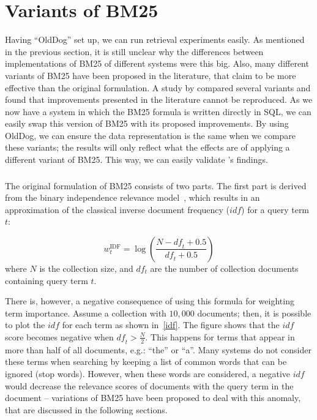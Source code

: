 \section{Variants of BM25}
\label{ir_db_variants}
Having ``OldDog'' set up, we can run retrieval experiments easily. As mentioned in the previous section, it is still unclear why the differences between implementations of BM25 of different systems were this big. Also, many different variants of BM25 have been proposed in the literature, that claim to be more effective than the original formulation. A study by \citet{trotman-bm25} compared several variants and found that improvements presented in the literature cannot be reproduced. 
As we now have a system in which the BM25 formula is written directly in SQL, we can easily swap this version of BM25 with its proposed improvements. By using OldDog, we can ensure the data representation is the same when we compare these variants; the results will only reflect what the effects are of applying a different variant of BM25. This way, we can easily validate \citeauthor{trotman-bm25}'s findings.

\subsubsection{} 
The original formulation of BM25 consists of two parts. The first part is derived from the binary independence relevance model~\citep{bm25-beyond}, which results in an approximation of the classical inverse document frequency ($\mathit{idf}$) for a query term $t$:

\begin{equation} 
	w_t^{\text{IDF}} = \log\left(\frac{N-\mathit{df}_t+0.5}{\mathit{df}_t+0.5}\right)
\end{equation}
where $N$ is the collection size, and $df_t$ are the number of collection documents containing query term $t$.  

There is, however, a negative consequence of using this formula for weighting term importance. Assume a collection with $10,000$ documents; then, it is possible to plot the $\mathit{idf}$ for each term as shown in~\cref{idf}. The figure shows that the $\mathit{idf}$ score becomes negative when $\mathit{df}_t > \frac{N}{2}$. This happens for terms that appear in more than half of all documents, e.g.: ``the'' or ``a''. Many systems do not consider these terms when searching by keeping a list of common words that can be ignored (stop words). However, when these words are considered,  a negative $\mathit{idf}$ would decrease the relevance scores of documents with the query term in the document -- variations of BM25 have been proposed to deal with this anomaly, that are discussed in the following sections. 

